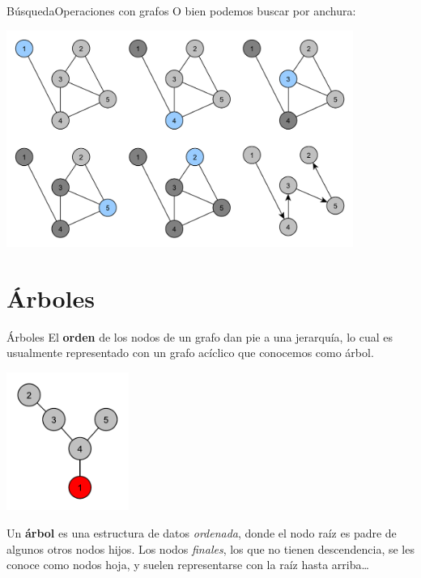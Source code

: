 \documentclass[spanish, c]{beamer}
\begin{document}
\begin{frame}{Búsqueda}{Operaciones con grafos}
    O bien podemos buscar por \alert{anchura}:
    \begin{center}
        \includegraphics[width=0.85\textwidth]{bfs.pdf}
    \end{center}
\end{frame}

\section{Árboles}

\begin{frame}{Árboles}
    El \textbf{orden} de los nodos de un grafo dan pie a una jerarquía, lo cual es usualmente representado con un grafo acíclico que conocemos como \alert{árbol}.
    \begin{center}
        \includegraphics[width=0.3\textwidth]{tree.pdf}
    \end{center}
    Un \textbf{árbol} es una estructura de datos \textit{ordenada}, donde el nodo \alert{raíz} es \alert{padre} de algunos otros nodos \alert{hijos}. Los nodos \textit{finales}, los que no tienen descendencia, se les conoce como nodos \alert{hoja}, y suelen representarse con la raíz hasta arriba\dots
\end{frame}
\end{document}
